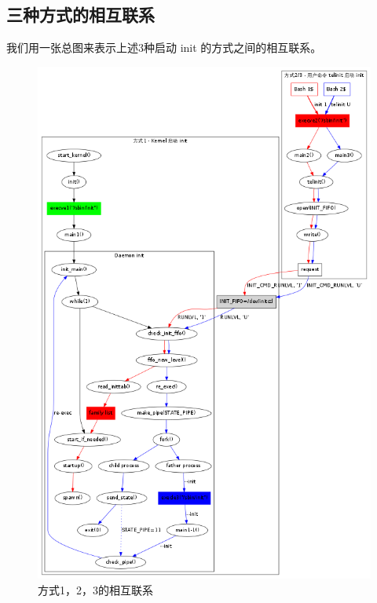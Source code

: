 \subsection{三种方式的相互联系}

我们用一张总图来表示上述3种启动 init 的方式之间的相互联系。

\begin{figure}[htbp]
\centering
\includegraphics{./figures/how-to-exec-init.png}
\caption{方式1，2，3的相互联系}
\end{figure}

